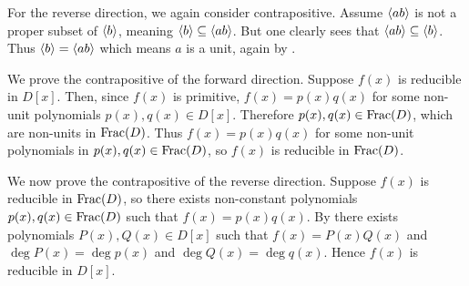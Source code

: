 \begin{questions}
    For the reverse direction, we again consider contrapositive. Assume $\left\langle ab\right\rangle$ is not a proper subset of $\left\langle b\right\rangle$, meaning $\left\langle b\right\rangle \subseteq \left\langle ab\right\rangle$. But one clearly sees that $\left\langle ab\right\rangle \subseteq \left\langle b\right\rangle$. Thus $\left\langle b\right\rangle = \left\langle ab\right\rangle$ which means $a$ is a unit, again by .

    \item We prove the contrapositive of the forward direction. Suppose $f(x)$ is reducible in $D[x]$. Then, since $f(x)$ is primitive, $f(x) = p(x)q(x)$ for some non-unit polynomials $p(x), q(x) \in D[x]$. Therefore $p(x), q(x) \in \mathrm{Frac}(D)$, which are non-units in $\mathrm{Frac}(D)$. Thus $f(x) = p(x)q(x)$ for some non-unit polynomials in $p(x), q(x) \in \mathrm{Frac}(D)$, so $f(x)$ is reducible in $\mathrm{Frac}(D)$.

    We now prove the contrapositive of the reverse direction. Suppose $f(x)$ is reducible in $\mathrm{Frac}(D)$, so there exists non-constant polynomials $p(x), q(x) \in \mathrm{Frac}(D)$ such that $f(x) = p(x)q(x)$. By  there exists polynomials $P(x), Q(x) \in D[x]$ such that $f(x) = P(x)Q(x)$ and $\deg P(x) = \deg p(x)$ and $\deg Q(x) = \deg q(x)$. Hence $f(x)$ is reducible in $D[x]$.
\end{questions}
